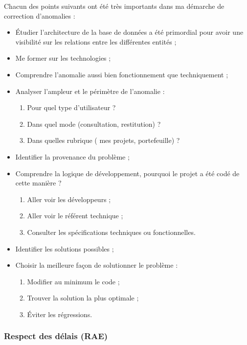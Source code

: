 Chacun des points suivants ont été très importants dans ma démarche de correction d'anomalies :
\begin{itemize}
    \item Étudier l'architecture de la base de données a été primordial pour avoir une visibilité sur les relations entre les différentes entités ;
    \item Me former sur les technologies ;
    \item Comprendre l'anomalie aussi bien fonctionnement que techniquement ;
    \item Analyser l'ampleur et le périmètre de l'anomalie :
    \begin{enumerate}
        \item Pour quel type d'utilisateur ?
        \item Dans quel mode (consultation, restitution) ?
        \item Dans quelles rubrique ( mes projets, portefeuille) ?
    \end{enumerate}
    \item Identifier la provenance du problème ;
    \item Comprendre la logique de développement, pourquoi le projet a été codé de cette manière ?
    \begin{enumerate}
        \item Aller voir les développeurs ;
        \item Aller voir le référent technique ;
        \item Consulter les spécifications techniques ou fonctionnelles.
    \end{enumerate}
    \item Identifier les solutions possibles ;
    \item Choisir la meilleure façon de solutionner le problème :
    \begin{enumerate}
        \item Modifier au minimum le code ;
        \item Trouver la solution la plus optimale ;
        \item Éviter les régressions.
    \end{enumerate}
 \end{itemize}              
            
\subsubsection{Respect des délais (RAE)}

